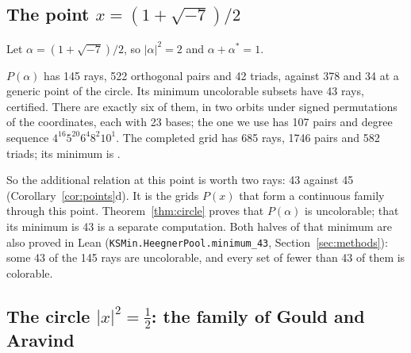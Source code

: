 \subsection{The point $x=(1+\sqrt{-7})/2$}

Let $\alpha=(1+\sqrt{-7})/2$, so $|\alpha|^2=2$ and $\alpha+\alpha^{*}=1$.

\begin{fact}\label{fact:heegner}
$P(\alpha)$ has 145 rays, 522 orthogonal pairs and 42 triads, against 378 and 34 at a generic
point of the circle.  Its minimum uncolorable subsets have 43 rays, certified.  There are exactly
six of them, in two orbits under signed permutations of the coordinates, each with 23 bases; the
one we use has 107 pairs and degree sequence $4^{16}5^{20}6^{4}8^{2}10^{1}$.  The completed grid
has 685 rays, 1746 pairs and 582 triads; its minimum is \heegnercompletedmin.
\end{fact}

So the additional relation at this point is worth two rays: 43 against 45
(Corollary~\ref{cor:points}d).  It is the grids $P(x)$ that form a continuous family through
this point.  Theorem~\ref{thm:circle} proves that $P(\alpha)$ is uncolorable; that its minimum is
43 is a separate computation.  Both halves of that minimum are also proved in Lean
(\texttt{KSMin.HeegnerPool.minimum\_43}, Section~\ref{sec:methods}): some 43 of the 145 rays are
uncolorable, and every set of fewer than 43 of them is colorable.

\subsection{The circle $|x|^2=\tfrac12$: the family of Gould and Aravind}\label{sec:halfcircle}

